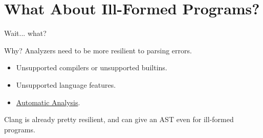 \documentclass[]{beamer}
\begin{document}
\section*{What About Ill-Formed Programs?}
\begin{frame}{Wait... what?}
  \begin{block}{Why?}
    Analyzers need to be more resilient to parsing errors.
    \begin{itemize}
      \item Unsupported compilers or unsupported builtins.
      \item Unsupported language features.
      \item \href{https://docs.sonarsource.com/sonarqube-cloud/advanced-setup/automatic-analysis}{Automatic Analysis}.
    \end{itemize}
  \end{block}
  Clang is already pretty resilient, and can give an AST even for ill-formed programs.
\end{frame}
\end{document}
